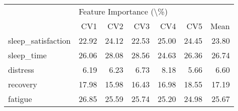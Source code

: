 \begin{tabular}{lrrrrrr}
\toprule
{} & \multicolumn{6}{l}{Feature Importance (\textbackslash \%)} \\
{} &                     CV1 &    CV2 &    CV3 &    CV4 &    CV5 &   Mean \\
\midrule
sleep\_satisfaction &                   22.92 &  24.12 &  22.53 &  25.00 &  24.45 &  23.80 \\
sleep\_time         &                   26.06 &  28.08 &  28.56 &  24.63 &  26.36 &  26.74 \\
distress           &                    6.19 &   6.23 &   6.73 &   8.18 &   5.66 &   6.60 \\
recovery           &                   17.98 &  15.98 &  16.43 &  16.98 &  18.55 &  17.19 \\
fatigue            &                   26.85 &  25.59 &  25.74 &  25.20 &  24.98 &  25.67 \\
\bottomrule
\end{tabular}
